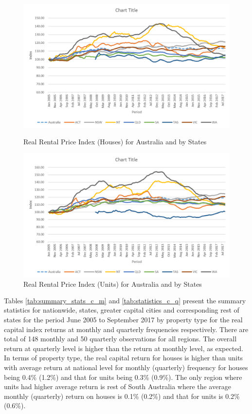 \documentclass[AEJ,reqno, draftmode]{AEA}
\begin{document}
\begin{figure}[!htb]
    \centering
     \includegraphics[width=\columnwidth]{Figures/Rental_houses_real_index_states.png}
 \caption{Real Rental Price Index (Houses) for Australia and by States}
 \label{fig:Rental_houses_real_index_states}
 \includegraphics[width=\columnwidth]{Figures/Rental_units_real_index_states.png}
 \caption{Real Rental Price Index (Units) for Australia and by States}
 \label{fig:Rental_units_real_index_states}
\end{figure}


Tables \ref{tab:summary_stats_c_m} and \ref{tab:statistics_c_q} present the summary statistics for nationwide, states, greater capital cities and corresponding rest of states for the period June 2005 to September 2017 by property type for the real capital index returns at monthly and quarterly frequencies respectively. There are total of 148 monthly and 50 quarterly observations for all regions. The overall return at quarterly level is higher than the return at monthly level, as expected. In terms of property type, the real capital return for houses is higher than units with average return at national level for monthly (quarterly) frequency for houses being 0.4\% (1.2\%) and that for units being 0.3\% (0.9\%). The only region where units had higher average return is rest of South Australia where the average monthly (quarterly) return on houses is 0.1\% (0.2\%) and that for units is 0.2\% (0.6\%).
\end{document}
